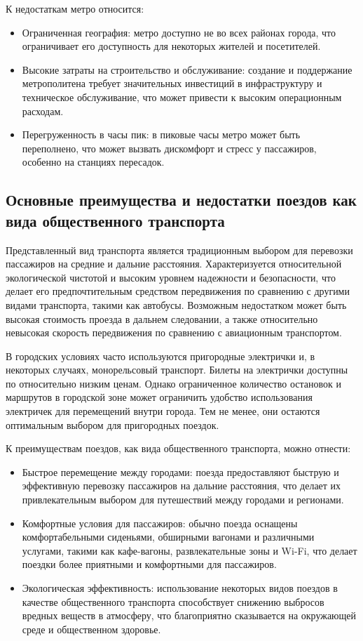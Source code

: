 К недостаткам метро относится:
\begin{itemize}
	\item Ограниченная география: метро доступно не во всех районах города, что ограничивает его доступность для некоторых жителей и посетителей.
	\item Высокие затраты на строительство и обслуживание: создание и поддержание метрополитена требует значительных инвестиций в инфраструктуру и техническое обслуживание, что может привести к высоким операционным расходам.
	\item Перегруженность в часы пик: в пиковые часы метро может быть переполнено, что может вызвать дискомфорт и стресс у пассажиров, особенно на станциях пересадок.
\end{itemize}

\subsection{Основные преимущества и недостатки поездов как вида общественного транспорта}

Представленный вид транспорта является традиционным выбором для перевозки пассажиров на средние и дальние расстояния. Характеризуется относительной экологической чистотой и высоким уровнем надежности и безопасности, что делает его предпочтительным средством передвижения по сравнению с другими видами транспорта, такими как автобусы. Возможным недостатком может быть высокая стоимость проезда в дальнем следовании, а также относительно невысокая скорость передвижения по сравнению с авиационным транспортом.

В городских условиях часто используются пригородные электрички и, в некоторых случаях, монорельсовый транспорт. Билеты на электрички доступны по относительно низким ценам. Однако ограниченное количество остановок и маршрутов в городской зоне может ограничить удобство использования электричек для перемещений внутри города. Тем не менее, они остаются оптимальным выбором для пригородных поездок.

К преимуществам поездов, как вида общественного транспорта, можно отнести:
\begin{itemize}
	\item Быстрое перемещение между городами: поезда предоставляют быструю и эффективную перевозку пассажиров на дальние расстояния, что делает их привлекательным выбором для путешествий между городами и регионами.
	\item Комфортные условия для пассажиров: обычно поезда оснащены комфортабельными сиденьями, обширными вагонами и различными услугами, такими как кафе-вагоны, развлекательные зоны и Wi-Fi, что делает поездки более приятными и комфортными для пассажиров.
	\item Экологическая эффективность: использование некоторых видов поездов в качестве общественного транспорта способствует снижению выбросов вредных веществ в атмосферу, что благоприятно сказывается на окружающей среде и общественном здоровье.
\end{itemize}

